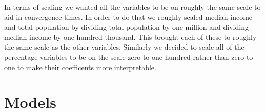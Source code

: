 \documentclass[12pt]{article}
\newcommand{\blue}[1]{\textcolor{blue}{#1}}
\begin{document}
In terms of scaling we wanted all the variables to be on roughly the same scale to aid in convergence times. In order to do that we roughly scaled median income and total population by dividing total population by one million and dividing median income by one hundred thousand. This brought each of these to roughly the same scale as the other variables. Similarly we decided to scale all of the percentage variables to be on the scale zero to one hundred rather than zero to one to make their coefficents more interpretable.  








\section{Models}
\end{document}
